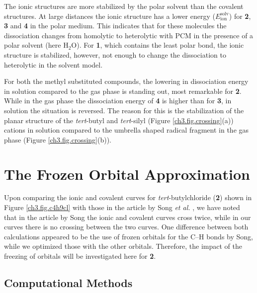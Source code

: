 The ionic structures are more stabilized by the polar solvent than the covalent structures. At large distances the ionic structure has a lower energy ($E_\mathrm{ion}^\mathrm{solv}$) for \textbf{2}, \textbf{3} and \textbf{4} in the polar medium. This indicates that for these molecules the dissociation changes from homolytic to heterolytic with PCM in the presence of a polar solvent (here H$_2$O). For \textbf{1}, which contains the least polar bond, the ionic structure is stabilized, however, not enough to change the dissociation to heterolytic in the solvent model.

For both the methyl substituted compounds, the lowering in dissociation energy in solution compared to the gas phase is standing out, most remarkable for \textbf{2}. While in the gas phase the dissociation energy of \textbf{4} is higher than for \textbf{3}, in solution the situation is reversed. The reason for this is the stabilization of the planar structure of the \textit{tert}-butyl and \textit{tert}-silyl  (Figure \ref{ch3.fig.crossing}(a)) cations in solution compared to the umbrella shaped radical fragment in the gas phase (Figure \ref{ch3.fig.crossing}(b)).

\section{The Frozen Orbital Approximation}

Upon comparing the ionic and covalent curves for \textit{tert}-butylchloride (\textbf{2}) shown in Figure \ref{ch3.fig.c4h9cl} with those in the article by Song \textit{et al.} \cite{song}, we have noted that in the article by Song the ionic and covalent curves cross twice, while in our curves there is no crossing between the two curves. One difference between both calculations appeared to be the use of frozen orbitals for the C--H bonds by Song, while we optimized those with the other orbitals. Therefore, the impact of the freezing of orbitals will be investigated here for \textbf{2}.

\subsection{Computational Methods}

